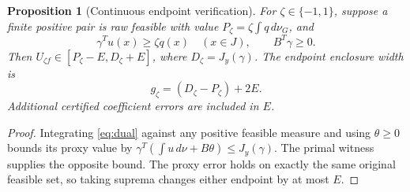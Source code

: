 \documentclass[10pt]{amsart}
\newtheorem{proposition}[theorem]{Proposition}
\theoremstyle{definition}
\theoremstyle{remark}
\newcommand{\dd}{\,d}
\begin{document}
\begin{proposition}[Continuous endpoint verification]\label{prop:verify}
For $\zeta\in\{-1,1\}$, suppose a finite positive pair is raw feasible with value $P_\zeta=\zeta\int q\dd\nu_G$, and
\begin{equation}\label{eq:dual}
 \gamma^Tu(x)\ge\zeta q(x)\quad(x\in J),\qquad B^T\gamma\ge0.
\end{equation}
Then $U_{\zeta f}\in[P_\zeta-E,D_\zeta+E]$, where $D_\zeta=J_y(\gamma)$. The endpoint enclosure width is
\begin{equation}\label{eq:gaps}
 g_\zeta=(D_\zeta-P_\zeta)+2E.
\end{equation}
Additional certified coefficient errors are included in $E$.
\end{proposition}
\begin{proof}
Integrating \eqref{eq:dual} against any positive feasible measure and using $\theta\ge0$ bounds its proxy value by $\gamma^T(\int u\dd\nu+B\theta)\le J_y(\gamma)$. The primal witness supplies the opposite bound. The proxy error holds on exactly the same original feasible set, so taking suprema changes either endpoint by at most $E$.
\end{proof}
\end{document}
